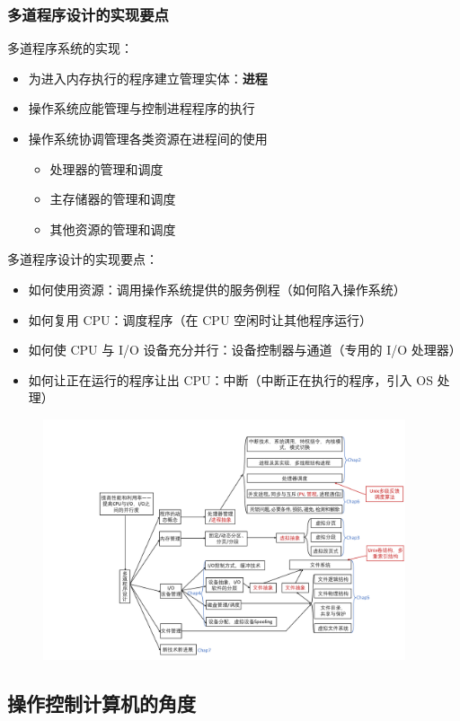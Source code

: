 \documentclass[cs4size,a4paper,10pt]{ctexart}
\begin{document}
		\subsubsection{多道程序设计的实现要点}
		多道程序系统的实现：
		\begin{itemize}
			\item 为进入内存执行的程序建立管理实体：\textbf{进程}
			\item 操作系统应能管理与控制进程程序的执行
			\item 操作系统协调管理各类资源在进程间的使用
			\begin{itemize}
				\item 处理器的管理和调度
				\item 主存储器的管理和调度
				\item 其他资源的管理和调度
			\end{itemize}
		\end{itemize}

		多道程序设计的实现要点：
		\begin{itemize}
			\item 如何使用资源：调用操作系统提供的服务例程（如何陷入操作系统）
			\item 如何复用 CPU：调度程序（在 CPU 空闲时让其他程序运行）
			\item 如何使 CPU 与 I/O 设备充分并行：设备控制器与通道（专用的 I/O 处理器）
			\item 如何让正在运行的程序让出 CPU：中断（中断正在执行的程序，引入 OS 处理）
		\end{itemize}
		\begin{figure}[H]
			\centering
			\includegraphics[width=0.95\textwidth]{img/1.3.2.2}
		\end{figure}


		\subsection{操作控制计算机的角度}
\end{document}
